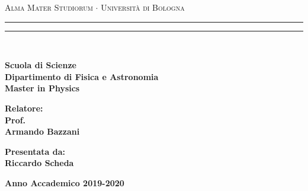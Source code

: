 \begin{titlepage}

\begin{center}
{{\Large{\textsc{Alma Mater Studiorum $\cdot$ Universit\`a di Bologna}}}} 
\rule[0.1cm]{15.8cm}{0.1mm}
\rule[0.5cm]{15.8cm}{0.6mm}
\\\vspace{3mm}

{\small{\bf Scuola di Scienze \\ 
Dipartimento di Fisica e Astronomia\\
Master in Physics}}

\end{center}

\vspace{23mm}
\begin{center}
\vspace{3mm}
{\LARGE{\bf }}
\vspace{3mm}
{\LARGE{\bf }}

\end{center}
\vspace{40mm}
\par
\noindent
\begin{minipage}[t]{0.47\textwidth}
{\large{\bf Relatore:\\
Prof.\\
Armando Bazzani}}
\end{minipage}
\hfill
\begin{minipage}[t]{0.47\textwidth}\raggedleft
{\large{\bf Presentata da:\\
Riccardo Scheda}}
\end{minipage}
\vspace{30mm}
\begin{center}
{\large{\bf Anno Accademico 2019-2020}}
\end{center}
\end{titlepage}


